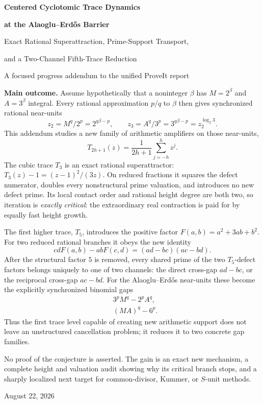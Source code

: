 \documentclass[11pt,oneside]{article}
\theoremstyle{definition}
\theoremstyle{remark}
\begin{document}

\begin{titlepage}
\centering
\vspace*{1.1cm}
{\Huge\bfseries Centered Cyclotomic Trace Dynamics\par}
\vspace{0.2cm}
{\Huge\bfseries at the Alaoglu--Erd\H{o}s Barrier\par}
\vspace{0.7cm}
{\LARGE Exact Rational Superattraction, Prime-Support Transport,\par}
\vspace{0.12cm}
{\LARGE and a Two-Channel Fifth-Trace Reduction\par}
\vspace{1.2cm}
{\large A focused progress addendum to the unified ProveIt report\par}
\vfill
\begin{minipage}{0.90\textwidth}
\small
\textbf{Main outcome.}
Assume hypothetically that a noninteger \(\beta\) has
\(M=2^\beta\) and \(A=3^\beta\) integral.  Every rational approximation
\(p/q\) to \(\beta\) then gives synchronized rational near-units
\[
 z_2=M^q/2^p=2^{q\beta-p},\qquad
 z_3=A^q/3^p=3^{q\beta-p}=z_2^{\log_2 3}.
\]
This addendum studies a new family of arithmetic amplifiers on those near-units,
\[
 T_{2h+1}(z)=\frac1{2h+1}\sum_{j=-h}^{h}z^j.
\]
The cubic trace \(T_3\) is an exact rational superattractor:
\(T_3(z)-1=(z-1)^2/(3z)\).  On reduced fractions it squares the defect numerator,
doubles every nonstructural prime valuation, and introduces no new defect prime.
Its local contact order and rational height degree are both two, so iteration is
\emph{exactly critical}: the extraordinary real contraction is paid for by equally fast
height growth.

The first higher trace, \(T_5\), introduces the positive factor
\(F(a,b)=a^2+3ab+b^2\).  For two reduced rational branches it obeys the new identity
\[
 cdF(a,b)-abF(c,d)=(ad-bc)(ac-bd).
\]
After the structural factor \(5\) is removed, every shared prime of the two
\(T_5\)-defect factors belongs uniquely to one of two channels: the direct cross-gap
\(ad-bc\), or the reciprocal cross-gap \(ac-bd\).  For the Alaoglu--Erd\H{o}s
near-units these become the explicitly synchronized binomial gaps
\[
 \begin{aligned}
  &3^pM^q-2^pA^q,\\
  &(MA)^q-6^p.
 \end{aligned}
\]
Thus the first trace level capable of creating new arithmetic support does not leave an
unstructured cancellation problem; it reduces it to two concrete gap families.

No proof of the conjecture is asserted.  The gain is an exact new mechanism, a complete
height and valuation audit showing why its critical branch stops, and a sharply localized
next target for common-divisor, Kummer, or \(S\)-unit methods.
\end{minipage}
\vfill
{\large August 22, 2026\par}
\end{titlepage}
\end{document}
